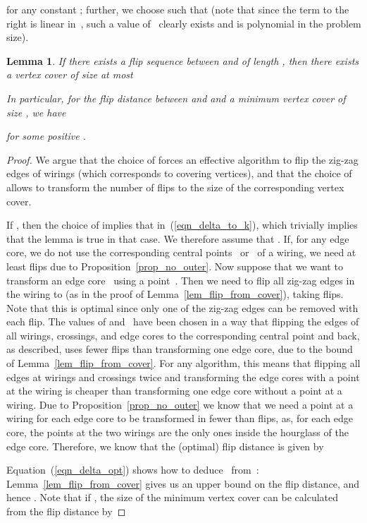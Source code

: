 \documentclass[11pt,a4paper]{article}
\newtheorem{lemma}[theorem]{Lemma}
\begin{document}
for any constant ; further, we choose  such that  (note that since the term to the right is linear in~, such a value of~ clearly exists and is polynomial in the problem size).
\begin{lemma}\label{lem_cover_from_flip}
If there exists a flip sequence between  and  of length , then there exists a vertex cover of size at most

In particular, for the flip distance  between  and  and a minimum vertex cover of size , we have 

for some positive .
\end{lemma}
\begin{proof}
We argue that the choice of  forces an effective algorithm to flip the zig-zag edges of wirings (which corresponds to covering vertices), and that the choice of  allows to transform the number of flips to the size of the corresponding vertex cover.

If , then the choice of  implies that  in~(\ref{eqn_delta_to_k}), which trivially implies that the lemma is true in that case.
We therefore assume that .
If, for any edge core, we do not use the corresponding central points~ or~ of a wiring, we need at least  flips due to Proposition~\ref{prop_no_outer}.
Now suppose that we want to transform an edge core~ using a point~.
Then we need to flip all zig-zag edges in the wiring to  (as in the proof of Lemma~\ref{lem_flip_from_cover}), taking  flips.
Note that this is optimal since only one of the zig-zag edges can be removed with each flip.
The values of  and~ have been chosen in a way that flipping the edges of all wirings, crossings, and edge cores to the corresponding central point and back, as described, uses fewer flips than transforming one edge core, due to the bound of Lemma~\ref{lem_flip_from_cover}.
For any algorithm, this means that flipping all edges at wirings and crossings twice and transforming the edge cores with a point at the wiring is cheaper than transforming one edge core without a point at a wiring.
Due to Proposition~\ref{prop_no_outer} we know that we need a point at a wiring for each edge core to be transformed in fewer than  flips, as, for each edge core, the points at the two wirings are the only ones inside the hourglass of the edge core.
Therefore, we know that the (optimal) flip distance  is given by




Equation~(\ref{eqn_delta_opt}) shows how to deduce~ from~:
Lemma~\ref{lem_flip_from_cover} gives us an upper bound on the flip distance, and hence .
Note that if , the size of the minimum vertex cover can be calculated from the flip distance by


\end{proof}
\end{document}
